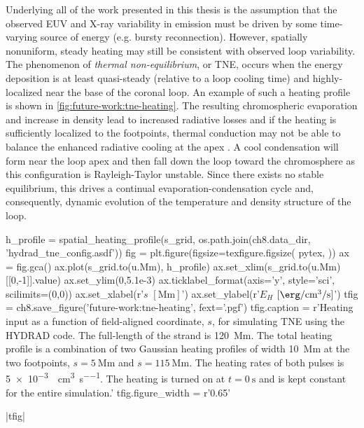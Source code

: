 Underlying all of the work presented in this thesis is the assumption that the observed EUV and X-ray variability in \AR{} emission must be driven by some time-varying source of energy (e.g. bursty reconnection). However, spatially nonuniform, steady heating may still be consistent with observed loop variability. The phenomenon of \textit{thermal non-equilibrium}, or TNE, occurs when the energy deposition is at least quasi-steady (relative to a loop cooling time) and highly-localized near the base of the coronal loop. An example of such a heating profile is shown in \autoref{fig:future-work:tne-heating}. The resulting chromospheric evaporation and increase in density lead to increased radiative losses and if the heating is sufficiently localized to the footpoints, thermal conduction may not be able to balance the enhanced radiative cooling at the apex \citep{kuin_thermal_1982,antiochos_model_1991}. A cool condensation will form near the loop apex and then fall down the loop toward the chromosphere as this configuration is Rayleigh-Taylor unstable. Since there exists no stable equilibrium, this drives a continual evaporation-condensation cycle and, consequently, dynamic evolution of the temperature and density structure of the loop.

\begin{pycode}[chapter8]
h_profile = spatial_heating_profile(s_grid, os.path.join(ch8.data_dir, 'hydrad_tne_config.asdf'))
fig = plt.figure(figsize=texfigure.figsize(
    pytex,
))
ax = fig.gca()
ax.plot(s_grid.to(u.Mm), h_profile)
ax.set_xlim(s_grid.to(u.Mm)[[0,-1]].value)
ax.set_ylim(0,5.1e-3)
ax.ticklabel_format(axis='y', style='sci', scilimits=(0,0))
ax.set_xlabel(r'$s$ $[\si{\mega\m}]$')
ax.set_ylabel(r'$E_H$ $[\si{\erg\per\cubic\cm\per\second}]$')
tfig = ch8.save_figure('future-work:tne-heating', fext='.pgf')
tfig.caption = r'Heating input as a function of field-aligned coordinate, $s$, for simulating TNE using the HYDRAD code. The full-length of the strand is \SI{120}{\mega\m}. The total heating profile is a combination of two Gaussian heating profiles of width \SI{10}{\mega\m} at the two footpoints, $s=\SI{5}{\mega\m}$ and $s=\SI{115}{\mega\m}$. The heating rates of both pulses is \SI{5e-3}{\erg\per\cubic\cm\per\second}. The heating is turned on at $t=\SI{0}{\second}$ and is kept constant for the entire simulation.'
tfig.figure_width = r'0.65\textwidth'
\end{pycode}
\py[chapter8]|tfig|


